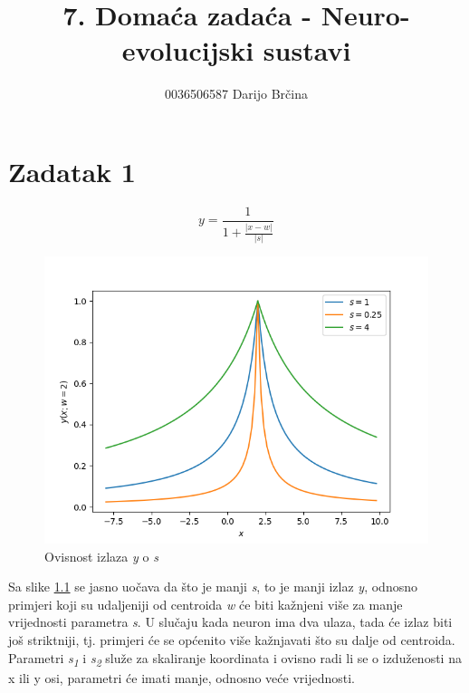 \documentclass[times, utf8, seminar]{fer}
\begin{document}
\title{7. Domaća zadaća - Neuro-evolucijski sustavi}
\author{0036506587 Darijo Brčina}

\maketitle

\tableofcontents

\chapter{Zadatak 1}
\begin{equation}
    y = \frac{1}{1+\frac{|x-w|}{|s|}}
\end{equation}
\begin{figure}[H]
    \centering
    \includegraphics[scale=0.75]{img/zad_1.png}
    \caption{Ovisnost izlaza \textit{y} o \textit{s}}
    \label{zad1:img}
\end{figure}
Sa slike \ref{zad1:img} se jasno uočava da što je manji \textit{s}, to je manji izlaz \textit{y}, odnosno primjeri koji su udaljeniji od centroida \textit{w} će biti kažnjeni više za manje vrijednosti parametra \textit{s}. U slučaju kada neuron ima dva ulaza, tada će izlaz biti još striktniji, tj. primjeri će se općenito više kažnjavati što su dalje od centroida. Parametri \textit{s\textsubscript{1}} i \textit{s\textsubscript{2}} služe za skaliranje koordinata i ovisno radi li se o izduženosti na x ili y osi, parametri će imati manje, odnosno veće vrijednosti.
\end{document}

